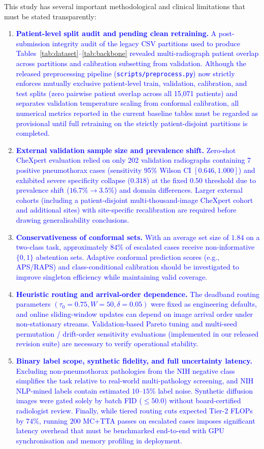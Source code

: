 \documentclass[diagnostics,article,submit,moreauthors]{Definitions/mdpi}
\newcommand{\rev}[1]{\textcolor{blue}{#1}}
\begin{document}
This study has several important methodological and clinical limitations that must be stated transparently:
\begin{enumerate}
\item \rev{\textbf{Patient-level split audit and pending clean retraining.} A post-submission integrity audit of the legacy CSV partitions used to produce Tables~\ref{tab:dataset}--\ref{tab:backbone} revealed multi-radiograph patient overlap across partitions and calibration subsetting from validation. Although the released preprocessing pipeline (\texttt{scripts/preprocess.py}) now strictly enforces mutually exclusive patient-level train, validation, calibration, and test splits (zero pairwise patient overlap across all 15,071 patients) and separates validation temperature scaling from conformal calibration, all numerical metrics reported in the current baseline tables must be regarded as provisional until full retraining on the strictly patient-disjoint partitions is completed.}
\item \rev{\textbf{External validation sample size and prevalence shift.} Zero-shot CheXpert evaluation relied on only 202 validation radiographs containing 7 positive pneumothorax cases (sensitivity 95\% Wilson CI $[0.646, 1.000]$) and exhibited severe specificity collapse ($0.318$) at the fixed $0.50$ threshold due to prevalence shift ($16.7\% \to 3.5\%$) and domain differences. Larger external cohorts (including a patient-disjoint multi-thousand-image CheXpert cohort and additional sites) with site-specific recalibration are required before drawing generalisability conclusions.}
\item \rev{\textbf{Conservativeness of conformal sets.} With an average set size of $1.84$ on a two-class task, approximately $84\%$ of escalated cases receive non-informative $\{0,1\}$ abstention sets. Adaptive conformal prediction scores (e.g., APS/RAPS) and class-conditional calibration should be investigated to improve singleton efficiency while maintaining valid coverage.}
\item \rev{\textbf{Heuristic routing and arrival-order dependence.} The deadband routing parameters $(\tau_0=0.75, W=50, \delta=0.05)$ were fixed as engineering defaults, and online sliding-window updates can depend on image arrival order under non-stationary streams. Validation-based Pareto tuning and multi-seed permutation / drift-order sensitivity evaluations (implemented in our released revision suite) are necessary to verify operational stability.}
\item \rev{\textbf{Binary label scope, synthetic fidelity, and full uncertainty latency.} Excluding non-pneumothorax pathologies from the NIH negative class simplifies the task relative to real-world multi-pathology screening, and NIH NLP-mined labels contain estimated $10$--$15\%$ label noise. Synthetic diffusion images were gated solely by batch FID ($\le 50.0$) without board-certified radiologist review. Finally, while tiered routing cuts expected Tier-2 FLOPs by $74\%$, running $200$ MC+TTA passes on escalated cases imposes significant latency overhead that must be benchmarked end-to-end with GPU synchronisation and memory profiling in deployment.}
\end{enumerate}
\end{document}
